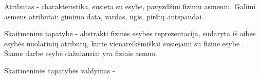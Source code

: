 Atributas - charakteristika, susieta su esybe, pavyzdžiui fiziniu asmeniu. Galimi asmens atributai: gimimo data,
vardas, ūgis, pirštų antspaudai \cite{Camp2004}. 

Skaitmeninė tapatybė - abstrakti fizinės esybės reprezentacija, sudaryta iš aibės esybės nuolatinių atributų,
kurie vienareikšmiškai susiejami su fizine esybe \cite{Glasser2009, Camp2004}. Šiame darbe
esybė dažniausiai yra fizinis asmuo.

Skaitmeninės tapatybės valdymas - 
